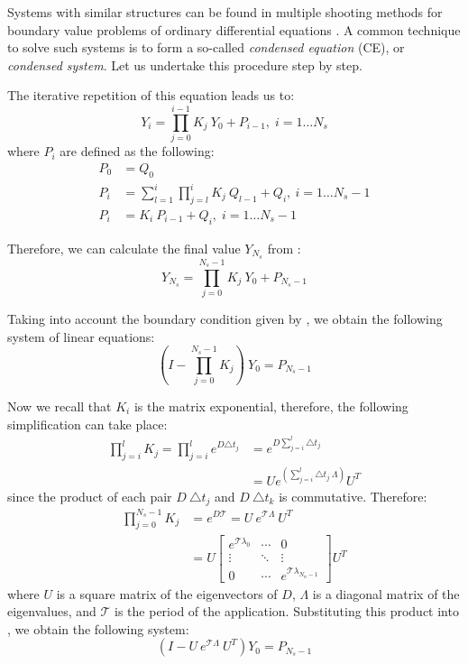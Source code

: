 Systems with similar structures can be found in multiple shooting methods for boundary value problems of ordinary differential equations \cite{stoer2002}. A common technique to solve such systems is to form a so-called \emph{condensed equation} (CE), or \emph{condensed system}. Let us undertake this procedure step by step.

The iterative repetition of this equation leads us to:
\begin{equation} \label{eq:y-recurrent}
  Y_i = \prod_{j = 0}^{i - 1} K_j \: Y_0 + P_{i - 1}, \; i = 1 \dots N_s
\end{equation}
where $P_i$ are defined as the following:
\begin{align}
  P_0 & = Q_0 \nonumber \\
  P_i & = \sum_{l = 1}^i \prod_{j = l}^i K_j \: Q_{l - 1} + Q_i, \: i = 1 \dots N_s - 1 \nonumber \\
  P_i & = K_i \: P_{i - 1} + Q_i, \; i = 1 \dots N_s - 1 \label{eq:p-recurrent}
\end{align}

Therefore, we can calculate the final value $Y_{N_s}$ from :
\[
  Y_{N_s} = \prod_{j = 0}^{N_s - 1} K_j \: Y_0 + P_{N_s - 1}
\]

Taking into account the boundary condition given by , we obtain the following system of linear equations:
\begin{equation} \label{eq:core-system}
  (I - \prod_{j = 0}^{N_s - 1} K_j) \: Y_0 = P_{N_s - 1}
\end{equation}

Now we recall that $K_i$ is the matrix exponential, therefore, the following simplification can take place:
\begin{align*}
  \prod_{j = i}^l K_j = \prod_{j = i}^l e^{D \triangle t_j} & = e^{D \sum_{j = i}^l \triangle t_j} \\
  & = U e^{\left( \sum_{j = i}^l \triangle t_j \: \Lambda \right)} U^T
\end{align*}
since the product of each pair $D \: \triangle t_j$ and $D \: \triangle t_k$ is commutative. Therefore:
\begin{align*}
  \prod_{j = 0}^{N_s - 1} K_j & = e^{D \mathcal{T}} = U \: e^{\mathcal{T} \Lambda} \: U^T \\
    & = U \left[
      \begin{array}{ccc}
        e^{\mathcal{T} \lambda_0} & \cdots & 0 \\
        \vdots & \ddots & \vdots \\
        0 & \cdots & e^{\mathcal{T} \lambda_{N_n - 1}}
      \end{array}
    \right] U^T
\end{align*}
where $U$ is a square matrix of the eigenvectors of $D$, $\Lambda$ is a diagonal matrix of the eigenvalues, and $\mathcal{T}$ is the period of the application. Substituting this product into , we obtain the following system:
\[
  (I - U \: e^{\mathcal{T} \Lambda} \: U^T) Y_0 = P_{N_s - 1}
\]

